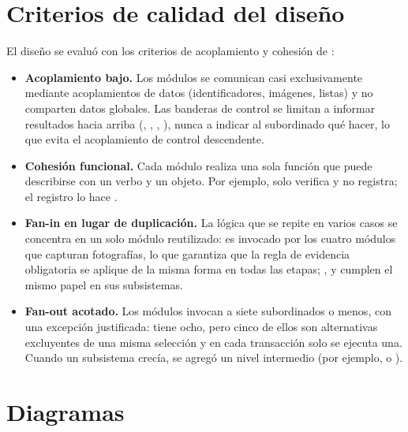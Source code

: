 \section{Criterios de calidad del diseño}

El diseño se evaluó con los criterios de acoplamiento y cohesión de
\textcite{yourdon1979}:

\begin{itemize}
    \item \textbf{Acoplamiento bajo.} Los módulos se comunican casi exclusivamente mediante
    acoplamientos de datos (identificadores, imágenes, listas) y no comparten datos
    globales. Las banderas de control se limitan a informar resultados hacia arriba
    (, , , ), nunca a indicar
    al subordinado qué hacer, lo que evita el acoplamiento de control descendente.
    \item \textbf{Cohesión funcional.} Cada módulo realiza una sola función que puede
    describirse con un verbo y un objeto. Por ejemplo,  solo
    verifica y no registra; el registro lo hace .
    \item \textbf{Fan-in en lugar de duplicación.} La lógica que se repite en varios casos se
    concentra en un solo módulo reutilizado:  es
    invocado por los cuatro módulos que capturan fotografías, lo que garantiza que la regla
    de evidencia obligatoria se aplique de la misma forma en todas las etapas;
    ,  y
     cumplen el mismo papel en sus subsistemas.
    \item \textbf{Fan-out acotado.} Los módulos invocan a siete subordinados o menos, con
    una excepción justificada:  tiene ocho, pero cinco de
    ellos son alternativas excluyentes de una misma selección y en cada transacción solo se
    ejecuta una. Cuando un subsistema crecía, se agregó un nivel intermedio (por ejemplo,
     o ).
\end{itemize}

\section{Diagramas}

